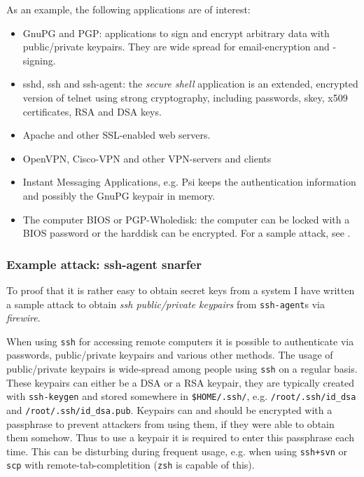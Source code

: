 As an example, the following applications are of interest:

\begin{itemize}

	\item GnuPG and PGP: applications to sign and encrypt arbitrary data
	with public/private keypairs. They are wide spread for email-encryption
	and -signing.

	\item sshd, ssh and ssh-agent: the \emph{secure shell} application is an
	extended, encrypted version of telnet using strong cryptography,
	including passwords, skey, x509 certificates, RSA and DSA keys.

	\item Apache and other SSL-enabled web servers.

	\item OpenVPN, Cisco-VPN and other VPN-servers and clients

	\item Instant Messaging Applications, e.g. Psi keeps the authentication
	information and possibly the GnuPG keypair in memory.

	\item The computer BIOS or PGP-Wholedisk: the computer can be locked
	with a BIOS password or the harddisk can be encrypted. For a sample
	attack, see \cite{rux2k6firewire}.

\end{itemize}


\subsubsection{Example attack: ssh-agent snarfer}

\label{ssh-agent-snarfer} To proof that it is rather easy to obtain secret keys
from a system I have written a sample attack to obtain \emph{ssh public/private
keypairs} from \texttt{ssh-agent}s via \emph{firewire}.

When using \texttt{ssh} for accessing remote computers it is possible to
authenticate via passwords, public/private keypairs and various other methods.
The usage of public/private keypairs is wide-spread among people using
\texttt{ssh} on a regular basis. These keypairs can either be a DSA or a RSA
keypair, they are typically created with \texttt{ssh-keygen} and stored
somewhere in \texttt{\$HOME/.ssh/}, e.g.  \texttt{/root/.ssh/id\_dsa} and
\texttt{/root/.ssh/id\_dsa.pub}. Keypairs can and should be encrypted with a
passphrase to prevent attackers from using them, if they were able to obtain
them somehow. Thus to use a keypair it is required to enter this passphrase each
time. This can be disturbing during frequent usage, e.g. when using
\texttt{ssh+svn} or \texttt{scp} with remote-tab-completition (\texttt{zsh} is
capable of this).

